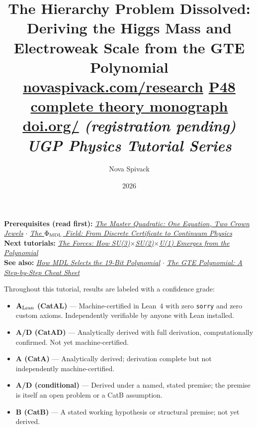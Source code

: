 \documentclass[11pt,a4paper]{article}
\date{2026}
\title{\textbf{The Hierarchy Problem Dissolved:}\\[6pt]
\large Deriving the Higgs Mass and Electroweak Scale from the GTE Polynomial\\[8pt]
\normalsize
\href{https://novaspivack.com/research}{novaspivack.com/research}\quad
\href{https://doi.org/10.5281/zenodo.20560550}{P48 complete theory monograph}\\[4pt]
\small\href{https://doi.org/\TutorialDOI}{doi.org/\TutorialDOI}
  \textit{(registration pending)}\\[4pt]
\normalsize\textit{UGP Physics Tutorial Series}}
\author{Nova Spivack}
\begin{document}
\setcounter{tocdepth}{2}
\maketitle
\tableofcontents
\newpage

\begin{tcolorbox}[colback=blue!6,colframe=blue!40!black,
  title=\textbf{UGP Physics Tutorial Series}]
\textbf{Prerequisites (read first):}
  \href{https://doi.org/10.5281/zenodo.20657868}{\emph{The Master Quadratic: One Equation, Two Crown Jewels}}
  $\cdot$
  \href{https://doi.org/10.5281/zenodo.20657885}{\emph{The $\Phi_{\rm MDL}$ Field: From Discrete Certificate to Continuum Physics}}\\[4pt]
\textbf{Next tutorials:}
  \href{https://doi.org/10.5281/zenodo.20669144}{\emph{The Forces: How SU(3)$\times$SU(2)$\times$U(1) Emerges from the Polynomial}}\\[4pt]
\textbf{See also:}
  \href{https://doi.org/10.5281/zenodo.20657876}{\emph{How MDL Selects the 19-Bit Polynomial}}
  $\cdot$
  \href{https://doi.org/10.5281/zenodo.20657889}{\emph{The GTE Polynomial: A Step-by-Step Cheat Sheet}}
\end{tcolorbox}

\begin{tcolorbox}[colback=boxgreen,colframe=green!50!black,
  title=\textbf{Claim-Strength Taxonomy}]
Throughout this tutorial, results are labeled with a confidence grade:
\begin{itemize}[itemsep=2pt]
  \item \textbf{$\mathbf{A}_{\rm Lean}$ (CatAL)} --- Machine-certified in Lean~4 with zero \texttt{sorry} and zero custom axioms.  Independently verifiable by anyone with Lean installed.
  \item \textbf{A/D (CatAD)} --- Analytically derived with full derivation, computationally confirmed.  Not yet machine-certified.
  \item \textbf{A (CatA)} --- Analytically derived; derivation complete but not independently machine-certified.
  \item \textbf{A/D (conditional)} --- Derived under a named, stated premise; the premise is itself an open problem or a CatB assumption.
  \item \textbf{B (CatB)} --- A stated working hypothesis or structural premise; not yet derived.
\end{itemize}
\end{tcolorbox}

\end{document}
